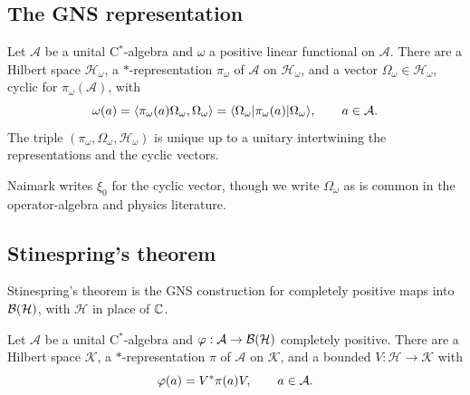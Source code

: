 \documentclass[12pt]{article}
\newcommand{\alg}{\mathcal{A}}             %
\newcommand{\hilbH}{\mathcal{H}}            %
\newcommand{\hilbK}{\mathcal{K}}             %
\newcommand{\bdd}[1]{\mathcal{B}\br{#1}}   %
\newcommand{\ip}[2]{\left\langle #1 , #2 \right\rangle}
\begin{document}
\subsection{The GNS representation}
\label{sec:gns}

\begin{theorem}
\label{thm:gns}
Let \(\alg\) be a unital C\(^*\)-algebra and \(\omega\) a positive linear
functional on \(\alg\). There are a Hilbert space \(\hilbH_\omega\), a
\(*\)-representation \(\pi_\omega\) of \(\alg\) on \(\hilbH_\omega\), and a vector
\(\Omega_\omega \in \hilbH_\omega\), cyclic for \(\pi_\omega(\alg)\), with
\begin{equation}
\label{eq:gns}
  \omega(a) = \ip{\pi_\omega(a)\Omega_\omega}{\Omega_\omega}
  = \bra{\Omega_\omega}\pi_\omega(a)\ket{\Omega_\omega} ,
  \qquad a \in \alg .
\end{equation}
The triple \((\pi_\omega, \Omega_\omega, \hilbH_\omega)\) is unique up to a
unitary intertwining the representations and the cyclic vectors.
\end{theorem}

Naimark writes \(\xi_0\) for the cyclic vector, though we write \(\Omega_\omega\)
as is common in the operator-algebra and physics literature.

\subsection{Stinespring's theorem}
\label{sec:stinespring}

Stinespring's theorem is the GNS construction for completely positive maps
into \(\bdd{\hilbH}\), with \(\hilbH\) in place of \({\mathbb C}\).

\begin{theorem}\label{thm:stinespring}
Let \(\alg\) be a unital C\(^*\)-algebra and \(\varphi : \alg \to \bdd{\hilbH}\)
completely positive. There are a Hilbert space \(\hilbK\), a \(*\)-representation
\(\pi\) of \(\alg\) on \(\hilbK\), and a bounded \(V : \hilbH \to \hilbK\) with
\begin{equation}
\label{eq:stinespring}
  \varphi(a) = V^\adjoint\pi(a)V , \qquad a \in \alg .
\end{equation}
\end{theorem}
\end{document}

